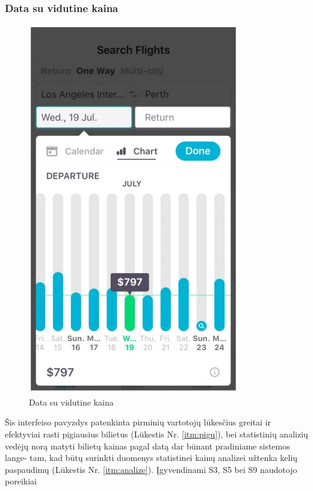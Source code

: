 \documentclass{VUMIFPSkursinis}
\begin{document}
\subsubsection{Data su vidutine kaina}
\begin{figure}[H]
    \centering
    \includegraphics[scale=1]{img/skyscanner.png}
    \caption{Data su vidutine kaina}
    \label{img:data2}
\end{figure}
Šis interfeiso pavyzdys patenkinta pirminių vartotojų lūkesčius greitai ir efektyviai rasti pigiausius bilietus (Lūkestis Nr. \ref{itm:pigu}), bei statistinių analizių vedėjų norą matyti bilietų kainas pagal datą dar būnant pradiniame sistemos lange- tam, kad būtų surinkti duomenys statistinei kainų analizei užtenka kelių paspaudimų (Lūkestis Nr. \ref{itm:analize}). Įgyvendinami S3, S5 bei S9 naudotojo poreikiai
\end{document}
